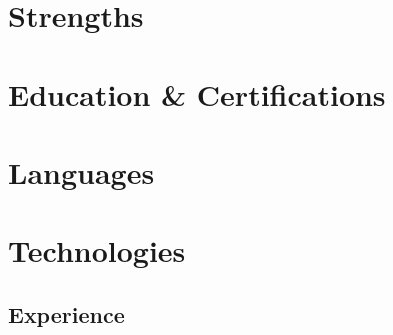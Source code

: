 \documentclass[a4paper,11pt]{article}
\begin{document}
  \setcolumnwidth{50mm, 11.6cm}
  \setlength{\columnsep}{4mm}
  \begin{paracol}{2}
    \begin{tcolorbox}[blanker, breakable, width=\linewidth]

        \section{Strengths}
        
        \section{Education \& Certifications}
        
        \section{Languages}

        \section{Technologies}

    \end{tcolorbox}
    \switchcolumn
    \begin{tcolorbox}[blanker, breakable, width=\linewidth]

        \section{Experience}
        
    \end{tcolorbox}
  \end{paracol}
\end{document}
